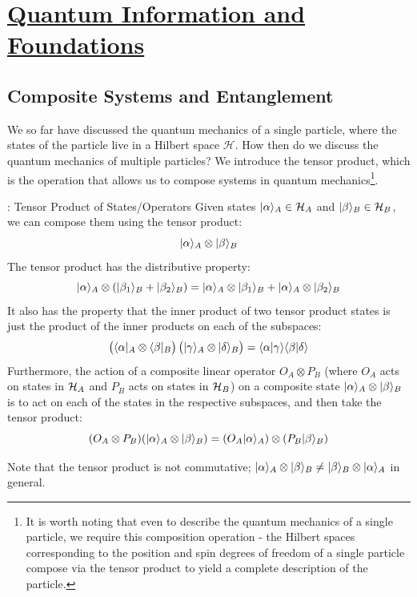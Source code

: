 \section[Quantum Information and Foundations]{\hyperlink{toc}{Quantum Information and Foundations}}

\subsection{Composite Systems and Entanglement}
We so far have discussed the quantum mechanics of a single particle, where the states of the particle live in a Hilbert space $\mathcal{H}$. How then do we discuss the quantum mechanics of multiple particles? We introduce the tensor product, which is the operation that allows us to compose systems in quantum mechanics\footnote{It is worth noting that even to describe the quantum mechanics of a single particle, we require this composition operation - the Hilbert spaces corresponding to the position and spin degrees of freedom of a single particle compose via the tensor product to yield a complete description of the particle.}. 

\begin{defbox}{: Tensor Product of States/Operators}
    Given states $\lvert \alpha \rangle_A \in \mathcal{H}_A$ and $\lvert \beta \rangle_B \in \mathcal{H}_B$, we can compose them using the tensor product: 
    \begin{equation}
        \lvert \alpha \rangle_A \otimes \lvert \beta \rangle_B
    \end{equation}
    The tensor product has the distributive property:
    \begin{equation}
        \lvert \alpha \rangle_A \otimes (\lvert \beta_1 \rangle_B + \lvert \beta_2 \rangle_B) = \lvert \alpha \rangle_A \otimes \lvert \beta_1 \rangle_B + \lvert \alpha \rangle_A \otimes \lvert \beta_2 \rangle_B
    \end{equation}
    It also has the property that the inner product of two tensor product states is just the product of the inner products on each of the subspaces:
    \begin{equation}
        \left(\langle \alpha \rvert_A \otimes \langle \beta \rvert_B \right) \left(\lvert \gamma \rangle_A \otimes \lvert \delta \rangle_B\right) = \langle \alpha \lvert \gamma \rangle \langle \beta \lvert \delta \rangle
    \end{equation}
    Furthermore, the action of a composite linear operator $O_A \otimes P_B$ (where $O_A$ acts on states in $\mathcal{H}_A$ and $P_B$ acts on states in $\mathcal{H}_B$) on a composite state $\lvert \alpha \rangle_A \otimes \lvert \beta \rangle_B$ is to act on each of the states in the respective subspaces, and then take the tensor product:
    \begin{equation}
        (O_A \otimes P_B)(\lvert \alpha \rangle_A \otimes \lvert \beta \rangle_B) = (O_A\lvert \alpha \rangle_A) \otimes (P_B\lvert \beta \rangle_B)
    \end{equation}
\end{defbox}
Note that the tensor product is not commutative; $\lvert \alpha \rangle_A \otimes \lvert \beta \rangle_B \neq \lvert \beta \rangle_B \otimes \lvert \alpha \rangle_A$ in general.

